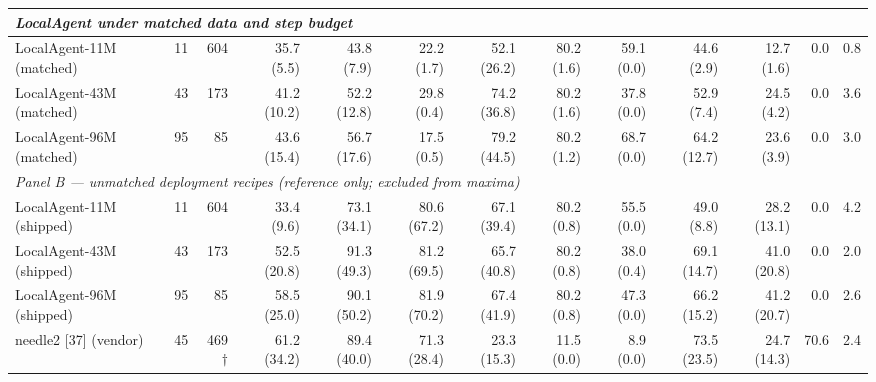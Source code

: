 \documentclass{article}
\begin{document}
\begin{table}[htbp]
{\begin{tabular}{lrr|rrr|rrrrrrr}
\midrule
\multicolumn{13}{l}{\emph{LocalAgent under matched data and step budget}} \\
\midrule
LocalAgent-11M (matched) & 11 & 604 & 35.7 {\scriptsize (5.5)} & 43.8 {\scriptsize (7.9)} & 22.2 {\scriptsize (1.7)} & 52.1 {\scriptsize (26.2)} & 80.2 {\scriptsize (1.6)} & 59.1 {\scriptsize (0.0)} & 44.6 {\scriptsize (2.9)} & 12.7 {\scriptsize (1.6)} & 0.0 & 0.8 \\
LocalAgent-43M (matched) & 43 & 173 & 41.2 {\scriptsize (10.2)} & 52.2 {\scriptsize (12.8)} & 29.8 {\scriptsize (0.4)} & 74.2 {\scriptsize (36.8)} & 80.2 {\scriptsize (1.6)} & 37.8 {\scriptsize (0.0)} & 52.9 {\scriptsize (7.4)} & 24.5 {\scriptsize (4.2)} & 0.0 & 3.6 \\
LocalAgent-96M (matched) & 95 & 85 & 43.6 {\scriptsize (15.4)} & 56.7 {\scriptsize (17.6)} & 17.5 {\scriptsize (0.5)} & 79.2 {\scriptsize (44.5)} & 80.2 {\scriptsize (1.2)} & 68.7 {\scriptsize (0.0)} & 64.2 {\scriptsize (12.7)} & 23.6 {\scriptsize (3.9)} & 0.0 & 3.0 \\
\midrule
\multicolumn{13}{l}{\emph{Panel B --- unmatched deployment recipes (reference only; excluded from maxima)}} \\
\midrule
LocalAgent-11M (shipped) & 11 & 604 & 33.4 {\scriptsize (9.6)} & 73.1 {\scriptsize (34.1)} & 80.6 {\scriptsize (67.2)} & 67.1 {\scriptsize (39.4)} & 80.2 {\scriptsize (0.8)} & 55.5 {\scriptsize (0.0)} & 49.0 {\scriptsize (8.8)} & 28.2 {\scriptsize (13.1)} & 0.0 & 4.2 \\
LocalAgent-43M (shipped) & 43 & 173 & 52.5 {\scriptsize (20.8)} & 91.3 {\scriptsize (49.3)} & 81.2 {\scriptsize (69.5)} & 65.7 {\scriptsize (40.8)} & 80.2 {\scriptsize (0.8)} & 38.0 {\scriptsize (0.4)} & 69.1 {\scriptsize (14.7)} & 41.0 {\scriptsize (20.8)} & 0.0 & 2.0 \\
LocalAgent-96M (shipped) & 95 & 85 & 58.5 {\scriptsize (25.0)} & 90.1 {\scriptsize (50.2)} & 81.9 {\scriptsize (70.2)} & 67.4 {\scriptsize (41.9)} & 80.2 {\scriptsize (0.8)} & 47.3 {\scriptsize (0.0)} & 66.2 {\scriptsize (15.2)} & 41.2 {\scriptsize (20.7)} & 0.0 & 2.6 \\
needle2 [37] (vendor) & 45 & 469$\dagger$ & 61.2 {\scriptsize (34.2)} & 89.4 {\scriptsize (40.0)} & 71.3 {\scriptsize (28.4)} & 23.3 {\scriptsize (15.3)} & 11.5 {\scriptsize (0.0)} & 8.9 {\scriptsize (0.0)} & 73.5 {\scriptsize (23.5)} & 24.7 {\scriptsize (14.3)} & 70.6 & 2.4 \\
\bottomrule
\end{tabular}}
\end{table}
\end{document}
